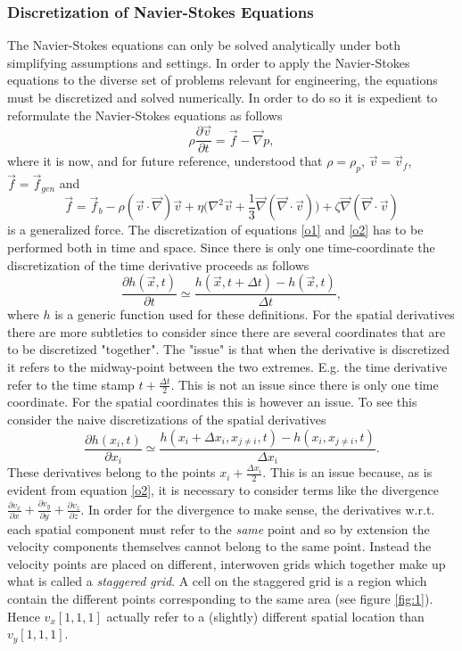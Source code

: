 \subsubsection{Discretization of Navier-Stokes Equations}
The Navier-Stokes equations can only be solved analytically under both simplifying assumptions and settings. In order to apply the Navier-Stokes equations to the diverse set of problems relevant for engineering, the equations must be discretized and solved numerically. In order to do so it is expedient to reformulate the Navier-Stokes equations as follows
\begin{equation}
	\rho\frac{\partial \vec{v}}{\partial t}=\vec{f}-\vec{\nabla}p,
	\label{o1}
\end{equation}
where it is now, and for future reference, understood that $\rho=\rho_p$, $\vec{v}=\vec{v}_f$, $\vec{f}=\vec{f}_{gen}$ and
\begin{equation}
	\vec{f}=\vec{f}_{b}-\rho(\vec{v}\cdot\vec{\nabla})\vec{v}+\eta\bigg(\nabla^2\vec{v}+\frac{1}{3}\vec{\nabla}(\vec{\nabla}\cdot\vec{v})\bigg)+\zeta\vec{\nabla}(\vec{\nabla}\cdot \vec{v})
	\label{o2}
\end{equation}
is a generalized force. The discretization of equations \eqref{o1} and \eqref{o2} has to be performed both in time and space. Since there is only one time-coordinate the discretization of the time derivative proceeds as follows
\begin{equation}
	\frac{\partial h(\vec{x},t)}{\partial t}\simeq \frac{h(\vec{x},t+\Delta t)-h(\vec{x},t)}{\Delta t},
\end{equation}
where $h$ is a generic function used for these definitions. For the spatial derivatives there are more subtleties to consider since there are several coordinates that are to be discretized "together". The "issue" is that when the derivative is discretized it refers to the midway-point between the two extremes. E.g. the time derivative refer to the time stamp $t+\frac{\Delta t}{2}$. This is not an issue since there is only one time coordinate. For the spatial coordinates this is however an issue. To see this consider the naive discretizations of the spatial derivatives
\begin{equation}
	\frac{\partial h(x_i,t)}{\partial x_i}\simeq \frac{h(x_i+\Delta x_i,x_{j\neq i},t)-h(x_i,x_{j\neq i},t)}{\Delta x_i}.
\end{equation}
These derivatives belong to the points $x_i+\frac{\Delta x_i}{2}$. This is an issue because, as is evident from equation \eqref{o2}, it is necessary to consider terms like the divergence $\frac{\partial v_x}{\partial x}+\frac{\partial v_y}{\partial y}+\frac{\partial v_z}{\partial z}$. In order for the divergence to make sense, the derivatives w.r.t. each spatial component must refer to the \emph{same} point and so by extension the velocity components themselves cannot belong to the same point. Instead the velocity points are placed on different, interwoven grids which together make up what is called a \emph{staggered grid}. A cell on the staggered grid is a region which contain the different points corresponding to the same area (see figure \ref{fig:1}). Hence $v_x[1,1,1]$ actually refer to a (slightly) different spatial location than $v_y[1,1,1]$.  

